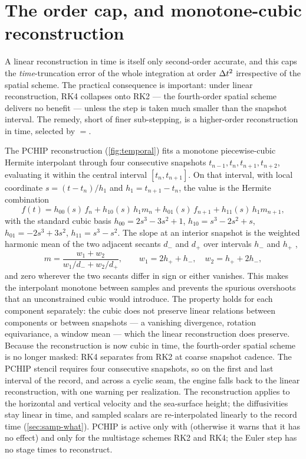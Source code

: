 \section{The order cap, and monotone-cubic reconstruction}\label{sec:temp-pchip}

A linear reconstruction in time is itself only second-order accurate, and this caps the
\emph{time}-truncation error of the whole integration at order $\Delta t^2$ irrespective of
the spatial scheme. The practical consequence is important: under linear reconstruction,
RK4 collapses onto RK2 --- the fourth-order spatial scheme delivers no benefit --- unless
the step is taken much smaller than the snapshot interval. The remedy, short of finer
sub-stepping, is a higher-order reconstruction in time, selected by
${}={}$.

The PCHIP reconstruction (\cref{fig:temporal}) fits a monotone piecewise-cubic Hermite
interpolant \citep{fritsch1980monotone} through four consecutive snapshots
$t_{n-1},t_n,t_{n+1},t_{n+2}$, evaluating it within the central interval
$[t_n,t_{n+1}]$. On that interval, with local coordinate $s=(t-t_n)/h_1$ and
$h_1=t_{n+1}-t_n$, the value is the Hermite combination
\begin{equation}\label{eq:pchip}
  f(t) = h_{00}(s)\,f_n + h_{10}(s)\,h_1 m_n + h_{01}(s)\,f_{n+1} + h_{11}(s)\,h_1 m_{n+1},
\end{equation}
with the standard cubic basis $h_{00}=2s^3-3s^2+1$, $h_{10}=s^3-2s^2+s$,
$h_{01}=-2s^3+3s^2$, $h_{11}=s^3-s^2$. The slope at an interior snapshot is the weighted harmonic
mean of the two adjacent secants $d_-$ and $d_+$ over intervals $h_-$ and $h_+$
\citep{fritsch1984method},
\begin{equation}\label{eq:pchip-slope}
  m=\frac{w_1+w_2}{w_1/d_-+w_2/d_+},\qquad w_1=2h_++h_-,\quad w_2=h_++2h_-,
\end{equation}
and zero wherever the two secants differ in sign or either vanishes. This makes the interpolant
monotone between samples and prevents the spurious overshoots that an unconstrained cubic would
introduce. The property holds for each component separately: the cubic does not preserve linear
relations between components or between snapshots --- a vanishing divergence, rotation equivariance, a
window mean --- which the linear reconstruction does preserve. Because the reconstruction is now cubic in time, the fourth-order spatial
scheme is no longer masked: RK4 separates from RK2 at coarse snapshot cadence. The PCHIP
stencil requires four consecutive snapshots, so on the first and last interval of the
record, and across a cyclic seam, the engine falls back to the linear reconstruction, with one warning
per realization. The reconstruction applies to the horizontal and vertical velocity and the sea-surface
height; the diffusivities stay linear in time, and sampled scalars are re-interpolated linearly to
the record time (\cref{sec:samp-what}). PCHIP is active
only with  (otherwise it warns that it has no effect) and only for the
multistage schemes RK2 and RK4; the Euler step has no stage times to reconstruct.

